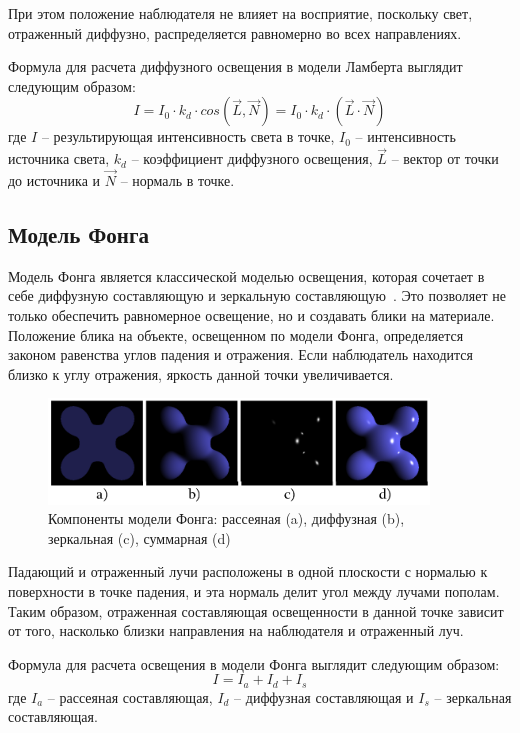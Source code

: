 При этом положение наблюдателя не влияет на восприятие, поскольку свет, отраженный диффузно, распределяется равномерно во всех направлениях.

Формула для расчета диффузного освещения в модели Ламберта выглядит следующим образом:
\begin{equation}
	I = I_0 \cdot k_d \cdot cos(\vec{L}, \vec{N}) = I_0 \cdot k_d \cdot (\vec{L} \cdot \vec{N})
	\label{eq:lambert}
\end{equation}
где $I$ -- результирующая интенсивность света в точке, $I_0$ -- интенсивность источника света, $k_d$ -- коэффициент диффузного освещения, $\vec{L}$ -- вектор от точки до источника и $\vec{N}$ -- нормаль в точке.

\subsection{Модель Фонга}
Модель Фонга является классической моделью освещения, которая сочетает в себе диффузную составляющую и зеркальную составляющую~\cite{lit3, lit7}. Это позволяет не только обеспечить равномерное освещение, но и создавать блики на материале. Положение блика на объекте, освещенном по модели Фонга, определяется законом равенства углов падения и отражения. Если наблюдатель находится близко к углу отражения, яркость данной точки увеличивается.
\begin{figure}[h] 
	\centering
	\includegraphics[width=0.9\textwidth]{images/phong-example.png}
	\caption{Компоненты модели Фонга: рассеяная (a), диффузная (b), зеркальная (c), суммарная (d)} 
	\label{fig:phong-example} 
\end{figure}

Падающий и отраженный лучи расположены в одной плоскости с нормалью к поверхности в точке падения, и эта нормаль делит угол между лучами пополам. Таким образом, отраженная составляющая освещенности в данной точке зависит от того, насколько близки направления на наблюдателя и отраженный луч.

Формула для расчета освещения в модели Фонга выглядит следующим образом:
\begin{equation}
	I = I_a + I_d + I_s
\end{equation}
где $I_a$ -- рассеяная составляющая, $I_d$ -- диффузная составляющая и $I_s$ -- зеркальная составляющая.

